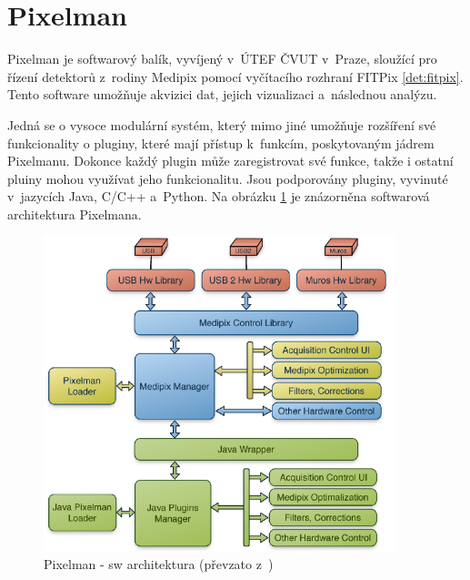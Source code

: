 \section{Pixelman}\label{det:pixelman}
Pixelman \cite{pixelman} je softwarový balík, vyvíjený v~ÚTEF ČVUT v~Praze, sloužící pro řízení detektorů z~rodiny Medipix pomocí vyčítacího rozhraní FITPix \ref{det:fitpix}. Tento software umožňuje akvizici dat, jejich vizualizaci a~následnou analýzu.

Jedná se o vysoce modulární systém, který mimo jiné umožňuje rozšíření své funkcionality o pluginy, které mají přístup k~funkcím, poskytovaným jádrem Pixelmanu. Dokonce každý plugin může zaregistrovat své funkce, takže i ostatní pluiny mohou využívat jeho funkcionalitu. Jsou podporovány pluginy, vyvinuté v~jazycích Java, C/C++ a~Python. Na obrázku \ref{fig:det:pixelman} je znázorněna softwarová architektura Pixelmana.

\begin{figure}[th!]
	\begin{center}
		\includegraphics[width=10.25cm]{figures/pixelman.png}
		\caption{Pixelman - sw architektura (převzato z~\cite{pixelman})}
		\label{fig:det:pixelman}
	\end{center}
\end{figure}




